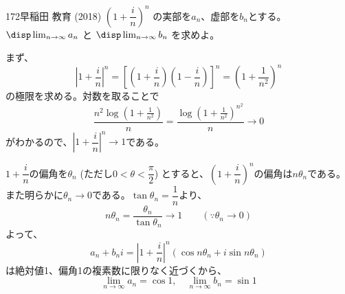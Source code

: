 \begin{thm}{172}{}{早稲田 教育 (2018)}
 $\left(1+\dfrac{i}{n}\right)^n$ の実部を$a_n$、虚部を$b_n$とする。$\disp \lim_{n\to\infty} a_n$ と $\disp \lim_{n\to\infty} b_n$ を求めよ。
\end{thm}

まず、
\[ \left|1+\frac{i}{n}\right|^n=\left[\left(1+\frac{i}{n}\right)\left(1-\frac{i}{n}\right)\right]^n=\left(1+\frac{1}{n^2}\right)^n \]
の極限を求める。対数を取ることで
\[ \frac{n^2\log\left(1+\frac{1}{n^2}\right)}{n}=\frac{\log\left(1+\frac{1}{n^2}\right)^{n^2}}{n} \to 0 \]
がわかるので、$\left|1+\dfrac{i}{n}\right|^n \to 1$である。

$1+\dfrac{i}{n}$の偏角を$\theta_n$ (ただし$0<\theta<\dfrac{\pi}{2}$) とすると、$\left(1+\dfrac{i}{n}\right)^n$の偏角は$n\theta_n$である。また明らかに$\theta_n \to 0$である。$\tan\theta_n=\dfrac{1}{n}$より、
\[ n\theta_n=\frac{\theta_n}{\tan\theta_n} \to 1 \qquad (\because \theta_n\to 0) \]
よって、
\[ a_n+b_ni=\left|1+\frac{i}{n}\right|^n(\cos n\theta_n+i\sin n\theta_n) \]
は絶対値1、偏角1の複素数に限りなく近づくから、
\[ \lim_{n\to\infty} a_n=\cos 1,\quad \lim_{n\to\infty} b_n=\sin 1 \]